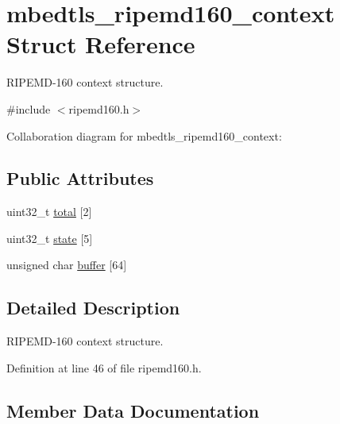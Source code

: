 \hypertarget{structmbedtls__ripemd160__context}{}\section{mbedtls\+\_\+ripemd160\+\_\+context Struct Reference}
\label{structmbedtls__ripemd160__context}


R\+I\+P\+E\+M\+D-\/160 context structure.  




{\ttfamily \#include $<$ripemd160.\+h$>$}



Collaboration diagram for mbedtls\+\_\+ripemd160\+\_\+context\+:
\subsection*{Public Attributes}
\begin{DoxyCompactItemize}
\item 
uint32\+\_\+t \mbox{\hyperlink{structmbedtls__ripemd160__context_afc1ec88d27b692be26d819a752be8d4a}{total}} \mbox{[}2\mbox{]}
\item 
uint32\+\_\+t \mbox{\hyperlink{structmbedtls__ripemd160__context_af56cf97ec4c54ae4bb540422b459782c}{state}} \mbox{[}5\mbox{]}
\item 
unsigned char \mbox{\hyperlink{structmbedtls__ripemd160__context_adc89115c7d047411c730324f779fae13}{buffer}} \mbox{[}64\mbox{]}
\end{DoxyCompactItemize}


\subsection{Detailed Description}
R\+I\+P\+E\+M\+D-\/160 context structure. 

Definition at line 46 of file ripemd160.\+h.



\subsection{Member Data Documentation}
\mbox{\label{structmbedtls__ripemd160__context_adc89115c7d047411c730324f779fae13}} 
